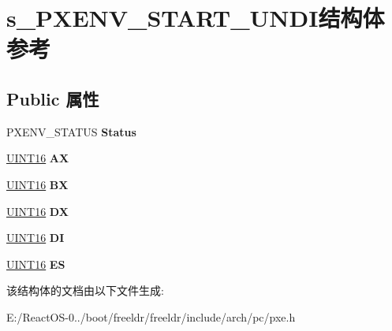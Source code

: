 \hypertarget{structs___p_x_e_n_v___s_t_a_r_t___u_n_d_i}{}\section{s\+\_\+\+P\+X\+E\+N\+V\+\_\+\+S\+T\+A\+R\+T\+\_\+\+U\+N\+D\+I结构体 参考}
\label{structs___p_x_e_n_v___s_t_a_r_t___u_n_d_i}
\subsection*{Public 属性}
\begin{DoxyCompactItemize}
\item 
\mbox{\label{structs___p_x_e_n_v___s_t_a_r_t___u_n_d_i_a01dee03924ea36309257deb1b1bf6d96}} 
P\+X\+E\+N\+V\+\_\+\+S\+T\+A\+T\+US {\bfseries Status}
\item 
\mbox{\label{structs___p_x_e_n_v___s_t_a_r_t___u_n_d_i_ac84332d1826d12f541bca61205343d8f}} 
\hyperlink{_processor_bind_8h_a09f1a1fb2293e33483cc8d44aefb1eb1}{U\+I\+N\+T16} {\bfseries AX}
\item 
\mbox{\label{structs___p_x_e_n_v___s_t_a_r_t___u_n_d_i_a40c1012ba43dd6ab113cbbd87b7177b5}} 
\hyperlink{_processor_bind_8h_a09f1a1fb2293e33483cc8d44aefb1eb1}{U\+I\+N\+T16} {\bfseries BX}
\item 
\mbox{\label{structs___p_x_e_n_v___s_t_a_r_t___u_n_d_i_ad0fccab19460b613d7a735b684502960}} 
\hyperlink{_processor_bind_8h_a09f1a1fb2293e33483cc8d44aefb1eb1}{U\+I\+N\+T16} {\bfseries DX}
\item 
\mbox{\label{structs___p_x_e_n_v___s_t_a_r_t___u_n_d_i_a132120fd832ae2cb8791b51d07573339}} 
\hyperlink{_processor_bind_8h_a09f1a1fb2293e33483cc8d44aefb1eb1}{U\+I\+N\+T16} {\bfseries DI}
\item 
\mbox{\label{structs___p_x_e_n_v___s_t_a_r_t___u_n_d_i_a6dfb74510b00181cdf8a0238b57bdc82}} 
\hyperlink{_processor_bind_8h_a09f1a1fb2293e33483cc8d44aefb1eb1}{U\+I\+N\+T16} {\bfseries ES}
\end{DoxyCompactItemize}


该结构体的文档由以下文件生成\+:\begin{DoxyCompactItemize}
\item 
E\+:/\+React\+O\+S-\/0../boot/freeldr/freeldr/include/arch/pc/pxe.\+h\end{DoxyCompactItemize}
